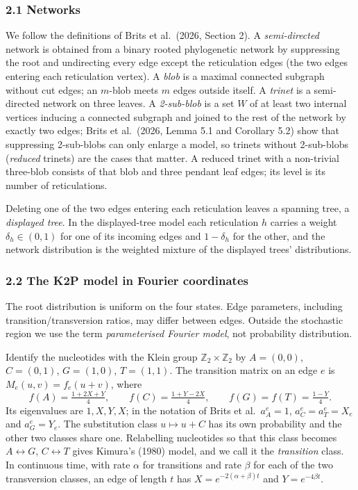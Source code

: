 \documentclass[
  11pt,
]{article}
\begin{document}
\subsubsection{2.1 Networks}\label{networks}

We follow the definitions of Brits et al.~(2026, Section 2). A
\emph{semi-directed} network is obtained from a binary rooted
phylogenetic network by suppressing the root and undirecting every edge
except the reticulation edges (the two edges entering each reticulation
vertex). A \emph{blob} is a maximal connected subgraph without cut
edges; an \(m\)-blob meets \(m\) edges outside itself. A \emph{trinet}
is a semi-directed network on three leaves. A \emph{2-sub-blob} is a set
\(W\) of at least two internal vertices inducing a connected subgraph
and joined to the rest of the network by exactly two edges; Brits et
al.~(2026, Lemma 5.1 and Corollary 5.2) show that suppressing
2-sub-blobs can only enlarge a model, so trinets without 2-sub-blobs
(\emph{reduced} trinets) are the cases that matter. A reduced trinet
with a non-trivial three-blob consists of that blob and three pendant
leaf edges; its level is its number of reticulations.

Deleting one of the two edges entering each reticulation leaves a
spanning tree, a \emph{displayed tree}. In the displayed-tree model each
reticulation \(h\) carries a weight \(\delta_h \in (0,1)\) for one of
its incoming edges and \(1-\delta_h\) for the other, and the network
distribution is the weighted mixture of the displayed trees'
distributions.

\subsubsection{2.2 The K2P model in Fourier
coordinates}\label{the-k2p-model-in-fourier-coordinates}

The root distribution is uniform on the four states. Edge parameters,
including transition/transversion ratios, may differ between edges.
Outside the stochastic region we use the term \emph{parameterised
Fourier model}, not probability distribution.

Identify the nucleotides with the Klein group
\(\mathbb{Z}_2\times\mathbb{Z}_2\) by \(A=(0,0)\), \(C=(0,1)\),
\(G=(1,0)\), \(T=(1,1)\). The transition matrix on an edge \(e\) is
\(M_e(u,v) = f_e(u+v)\), where
\[f(A)=\tfrac{1+2X+Y}{4},\qquad f(C)=\tfrac{1+Y-2X}{4},\qquad f(G)=f(T)=\tfrac{1-Y}{4}.\]
Its eigenvalues are \(1, X, Y, X\); in the notation of Brits et
al.~\(a^e_A=1\), \(a^e_C=a^e_T=X_e\) and \(a^e_G=Y_e\). The substitution
class \(u\mapsto u+C\) has its own probability and the other two classes
share one. Relabelling nucleotides so that this class becomes
\(A\leftrightarrow G\), \(C\leftrightarrow T\) gives Kimura's (1980)
model, and we call it the \emph{transition} class. In continuous time,
with rate \(\alpha\) for transitions and rate \(\beta\) for each of the
two transversion classes, an edge of length \(t\) has
\(X = e^{-2(\alpha+\beta)t}\) and \(Y = e^{-4\beta t}\).
\end{document}
